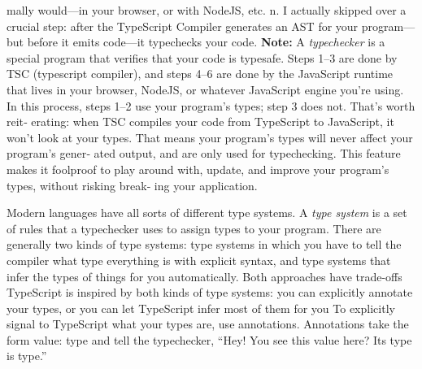 \documentclass{report}
\begin{document}
mally would—in your browser, or with NodeJS, etc.
\bigbreak \noindent 
n. I actually skipped over a crucial step: after the TypeScript Compiler generates an AST for your program—but before it emits code—it typechecks your code.
\bigbreak \noindent 
\textbf{Note:} A \textit{typechecker} is a special program that verifies that your code is typesafe.
\bigbreak \noindent 
{}
\bigbreak \noindent 
Steps 1–3 are done by TSC (typescript compiler), and steps 4–6 are done by the JavaScript runtime that lives in your browser, NodeJS, or whatever JavaScript engine you’re using.
\bigbreak \noindent 
In this process, steps 1–2 use your program’s types; step 3 does not. That’s worth reit‐ erating: when TSC compiles your code from TypeScript to JavaScript, it won’t look at your types. That means your program’s types will never affect your program’s gener‐ ated output, and are only used for typechecking. This feature makes it foolproof to play around with, update, and improve your program’s types, without risking break‐ ing your application.

\pagebreak 
{}
\bigbreak \noindent 
Modern languages have all sorts of different type systems. A \textit{type system} is a set of rules that a typechecker uses to assign types to your program.
\bigbreak \noindent 
There are generally two kinds of type systems: type systems in which you have to tell the compiler what type everything is with explicit syntax, and type systems that infer the types of things for you automatically. Both approaches have trade-offs
\bigbreak \noindent 
TypeScript is inspired by both kinds of type systems: you can explicitly annotate your types, or you can let TypeScript infer most of them for you
\bigbreak \noindent 
To explicitly signal to TypeScript what your types are, use annotations. Annotations take the form value: type and tell the typechecker, “Hey! You see this value here? Its type is type.”
    
\end{document}
